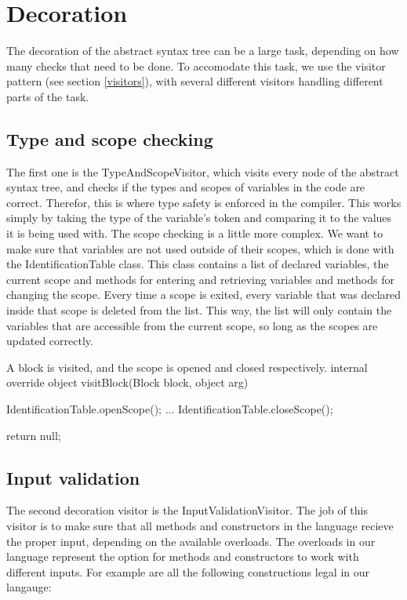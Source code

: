 \section{Decoration}
The decoration of the abstract syntax tree can be a large task, depending on how many checks that need to be done. 
To accomodate this task, we use the visitor pattern (see section \ref{visitors}), with several different visitors handling different parts of the task. \newline

\subsection{Type and scope checking}
The first one is the TypeAndScopeVisitor, which visits every node of the abstract syntax tree, and checks if the types and scopes of variables in the code are correct.\newline
Therefor, this is where type safety is enforced in the compiler. 
This works simply by taking the type of the variable's token and comparing it to the values it is being used with. \newline
The scope checking is a little more complex. 
We want to make sure that variables are not used outside of their scopes, which is done with the IdentificationTable class. 
This class contains a list of declared variables, the current scope and methods for entering and retrieving variables and methods for changing the scope.\newline
Every time a scope is exited, every variable that was declared inside that scope is deleted from the list. 
This way, the list will only contain the variables that are accessible from the current scope, so long as the scopes are updated correctly.

\begin{source}{A block is visited, and the scope is opened and closed respectively.}{}
internal override object visitBlock(Block block, object arg)
		{
        IdentificationTable.openScope();
        ...
        IdentificationTable.closeScope();

        return null;
     }
\end{source}

\subsection{Input validation}
\label{inputvalidation}
The second decoration visitor is the InputValidationVisitor. 
The job of this visitor is to make sure that all methods and constructors in the language recieve the proper input, depending on the available overloads. 
The overloads in our language represent the option for methods and constructors to work with different inputs.
For example are all the following constructions legal in our langauge:

